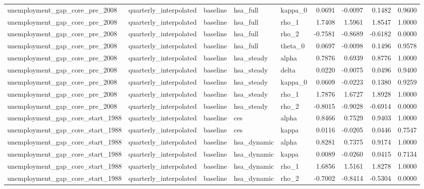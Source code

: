 \begin{tabular}{lllllrrrr}
unemployment\_gap\_core\_pre\_2008 & quarterly\_interpolated & baseline & hsa\_full & kappa\_0 & 0.0691 & -0.0097 & 0.1482 & 0.9600 \\
unemployment\_gap\_core\_pre\_2008 & quarterly\_interpolated & baseline & hsa\_full & rho\_1 & 1.7408 & 1.5961 & 1.8547 & 1.0000 \\
unemployment\_gap\_core\_pre\_2008 & quarterly\_interpolated & baseline & hsa\_full & rho\_2 & -0.7581 & -0.8689 & -0.6182 & 0.0000 \\
unemployment\_gap\_core\_pre\_2008 & quarterly\_interpolated & baseline & hsa\_full & theta\_0 & 0.0697 & -0.0098 & 0.1496 & 0.9578 \\
unemployment\_gap\_core\_pre\_2008 & quarterly\_interpolated & baseline & hsa\_steady & alpha & 0.7876 & 0.6939 & 0.8776 & 1.0000 \\
unemployment\_gap\_core\_pre\_2008 & quarterly\_interpolated & baseline & hsa\_steady & delta & 0.0220 & -0.0075 & 0.0496 & 0.9400 \\
unemployment\_gap\_core\_pre\_2008 & quarterly\_interpolated & baseline & hsa\_steady & kappa\_0 & 0.0609 & -0.0223 & 0.1380 & 0.9259 \\
unemployment\_gap\_core\_pre\_2008 & quarterly\_interpolated & baseline & hsa\_steady & rho\_1 & 1.7876 & 1.6727 & 1.8928 & 1.0000 \\
unemployment\_gap\_core\_pre\_2008 & quarterly\_interpolated & baseline & hsa\_steady & rho\_2 & -0.8015 & -0.9028 & -0.6914 & 0.0000 \\
unemployment\_gap\_core\_start\_1988 & quarterly\_interpolated & baseline & ces & alpha & 0.8466 & 0.7529 & 0.9403 & 1.0000 \\
unemployment\_gap\_core\_start\_1988 & quarterly\_interpolated & baseline & ces & kappa & 0.0116 & -0.0205 & 0.0446 & 0.7547 \\
unemployment\_gap\_core\_start\_1988 & quarterly\_interpolated & baseline & hsa\_dynamic & alpha & 0.8281 & 0.7375 & 0.9174 & 1.0000 \\
unemployment\_gap\_core\_start\_1988 & quarterly\_interpolated & baseline & hsa\_dynamic & kappa & 0.0089 & -0.0260 & 0.0415 & 0.7134 \\
unemployment\_gap\_core\_start\_1988 & quarterly\_interpolated & baseline & hsa\_dynamic & rho\_1 & 1.6856 & 1.5161 & 1.8278 & 1.0000 \\
unemployment\_gap\_core\_start\_1988 & quarterly\_interpolated & baseline & hsa\_dynamic & rho\_2 & -0.7002 & -0.8414 & -0.5304 & 0.0000 \\

\end{tabular}
